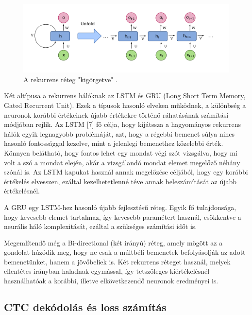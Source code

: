 \begin{figure}[!ht]
\centering
\includegraphics[width=150mm, keepaspectratio]{figures/rnn.png}
\caption{A rekurrens réteg "kigörgetve" \cite{rnn}.}
\label{fig:TeXstudio}
\end{figure}

Két altípusa a rekurrens hálóknak az LSTM és GRU (Long Short Term Memory, Gated Recurrent Unit). Ezek a típusok hasonló elveken működnek, a különbség a neuronok korábbi értékeinek újabb értékekre történő ráhatásának számítási módjában rejlik. Az LSTM [7] fő célja, hogy kijátssza a hagyományos rekurrens hálók egyik legnagyobb problémáját, azt, hogy a régebbi bemenet súlya nincs hasonló fontossággal kezelve, mint a jelenlegi bemenethez közelebbi érték. Könnyen belátható, hogy fontos lehet egy mondat végi szót vizsgálva, hogy mi volt a szó a mondat elején, akár a vizsgálandó mondat elemet megelőző néhány szónál is. Az LSTM kapukat használ annak megelőzése céljából, hogy egy korábbi értékelés elvesszen, ezáltal kezelhetetlenné téve annak beleszámítását az újabb értékelésnél.

A GRU egy LSTM-hez hasonló újabb fejlesztésű réteg. Egyik fő tulajdonsága, hogy kevesebb elemet tartalmaz, így kevesebb paramétert használ, csökkentve a neurális háló komplexitását, ezáltal a szükséges számítási időt is.

Megemlítendő még a Bi-directional (két irányú) réteg, amely mögött az a gondolat húzódik meg, hogy ne csak a múltbéli bemenetek befolyásolják az adott bemenetünket, hanem a jövőbeliek is. Két rekurrens réteget használ, melyek ellentétes irányban haladnak egymással, így tetszőleges kiértékelésnél használhatóak a korábbi, illetve elkövetkezendő neuronok eredményei is.

\subsection{CTC dekódolás és loss számítás}

